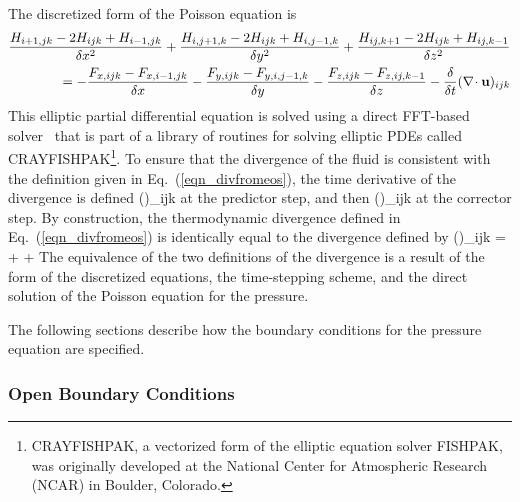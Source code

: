 The discretized form of the Poisson equation is
\begin{align}
\frac{H_{i+1,jk}-2H_{ijk}+H_{i-1,jk}}{\delta x^2} +
\frac{H_{i,j+1,k}-2H_{ijk}+H_{i,j-1,k}}{\delta y^2} +
\frac{H_{ij,k+1}-2H_{ijk}+H_{ij,k-1}}{\delta z^2} \notag \\ =
    -\frac{F_{x,ijk} - F_{x,i-1,jk}}{\delta x}
    -\frac{F_{y,ijk} - F_{y,i,j-1,k}}{\delta y}
    -\frac{F_{z,ijk} - F_{z,ij,k-1}}{\delta z} - \frac{\delta}{\delta t}(\nabla\!\cdot {\mathbf{u}})_{ijk}
\label{pe_fin}
\end{align}
This elliptic partial differential equation is solved using a direct FFT-based solver~\cite{Sweet:1} that is part of a library of routines for solving elliptic PDEs called CRAYFISHPAK\footnote{CRAYFISHPAK, a vectorized form of the elliptic equation solver FISHPAK, was originally developed at the National Center for Atmospheric Research (NCAR) in Boulder, Colorado.}. To ensure that the divergence of the fluid is consistent with the definition given in Eq.~(\ref{eqn_divfromeos}), the time derivative of the divergence is defined
\be
   (\nabla\!\cdot \bu)_{ijk} \equiv
\ee
at the predictor step, and then
\be
   (\nabla\!\cdot \bu)_{ijk} \equiv
\ee
at the corrector step. By construction, the thermodynamic divergence defined in Eq.~(\ref{eqn_divfromeos}) is identically equal to the divergence defined by
\be
(\nabla\!\cdot \bu)_{ijk} =  +  + 
\ee
The equivalence of the two definitions of the divergence is a result of the form of the discretized equations, the time-stepping scheme, and the direct solution of the Poisson equation for the pressure.

The following sections describe how the boundary conditions for the pressure equation are specified.


\subsubsection{Open Boundary Conditions}


